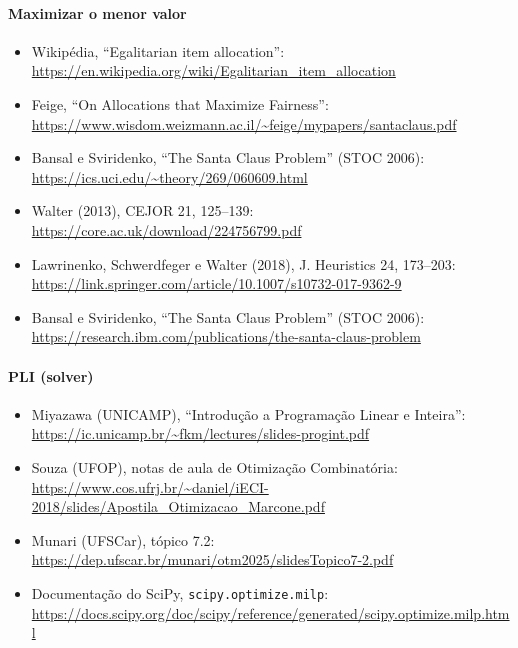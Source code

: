 \documentclass[12pt,a4paper]{article}
\begin{document}
\paragraph{Maximizar o menor valor}
\begin{itemize}
  \item Wikipédia, ``Egalitarian item allocation'': \url{https://en.wikipedia.org/wiki/Egalitarian_item_allocation}
  \item Feige, ``On Allocations that Maximize Fairness'': \url{https://www.wisdom.weizmann.ac.il/~feige/mypapers/santaclaus.pdf}
  \item Bansal e Sviridenko, ``The Santa Claus Problem'' (STOC 2006): \url{https://ics.uci.edu/~theory/269/060609.html}
  \item Walter (2013), CEJOR 21, 125--139: \url{https://core.ac.uk/download/224756799.pdf}
  \item Lawrinenko, Schwerdfeger e Walter (2018), J. Heuristics 24, 173--203: \url{https://link.springer.com/article/10.1007/s10732-017-9362-9}
  \item Bansal e Sviridenko, ``The Santa Claus Problem'' (STOC 2006): \url{https://research.ibm.com/publications/the-santa-claus-problem}
\end{itemize}

\paragraph{PLI (solver)}
\begin{itemize}
  \item Miyazawa (UNICAMP), ``Introdução a Programação Linear e Inteira'': \url{https://ic.unicamp.br/~fkm/lectures/slides-progint.pdf}
  \item Souza (UFOP), notas de aula de Otimização Combinatória: \url{https://www.cos.ufrj.br/~daniel/iECI-2018/slides/Apostila_Otimizacao_Marcone.pdf}
  \item Munari (UFSCar), tópico 7.2: \url{https://dep.ufscar.br/munari/otm2025/slidesTopico7-2.pdf}
  \item Documentação do SciPy, \texttt{scipy.optimize.milp}: \url{https://docs.scipy.org/doc/scipy/reference/generated/scipy.optimize.milp.html}
\end{itemize}
\end{document}
